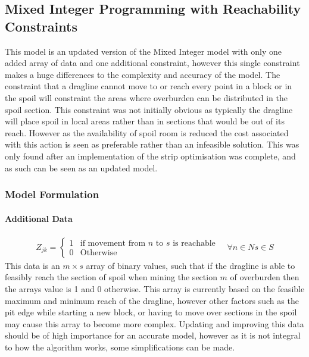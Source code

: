 \subsection{Mixed Integer Programming with Reachability Constraints}
This model is an updated version of the Mixed Integer model with only one added array of data and one additional constraint, however this single constraint makes a huge differences to the complexity and accuracy of the model. The constraint that a dragline cannot move to or reach every point in a block or in the spoil will constraint the areas where overburden can be distributed in the spoil section. This constraint was not initially obvious as typically the dragline will place spoil in local areas rather than in sections that would be out of its reach. However as the availability of spoil room is reduced the cost associated with this action is seen as preferable rather than an infeasible solution. This was only found after an implementation of the strip optimisation was complete, and as such can be seen as an updated model. 
\subsubsection{Model Formulation}
\paragraph*{Additional Data}

\begin{align}
\label{MIP:Data Valid}
Z_{jk}  = \begin{cases} 1& \text{if movement from $n$ to $s$ is reachable}\\
0 & \text{Otherwise}   \end{cases} 
\quad \forall n \in N s\in S
\end{align}
This data is an $m\times s$ array of binary values, such that if the dragline is able to feasibly reach the section of spoil when mining the section $m$ of overburden then the arrays value is 1 and 0 otherwise. This array is currently based on the feasible  maximum and minimum reach of the dragline, however other factors such as the pit edge while starting a new block, or having to move over sections in the spoil may cause this array to become more complex. Updating and improving this data should be of high importance for an accurate model, however as it is not integral to how the algorithm works, some simplifications can be made.
